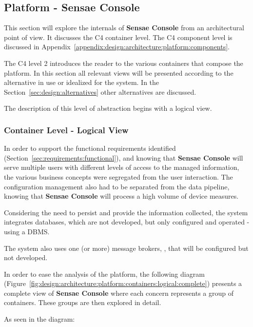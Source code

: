 \subsection{Platform - Sensae Console}
\label{subsec:design:architecture:platform}

This section will explore the internals of \textbf{Sensae Console} from an architectural point of view. It discusses the C4 container level.
The C4 component level is discussed in Appendix~\ref{appendix:design:architecture:platform:components}.

The C4 level 2 introduces the reader to the various containers that compose the platform. In this section all relevant views will be presented according to the alternative in use or idealized for the system. In the Section~\ref{sec:design:alternatives} other alternatives are discussed.

The description of this level of abstraction begins with a logical view.

\subsubsection{Container Level - Logical View}
\label{par:design:architecture:platform:container:logical}

In order to support the functional requirements identified (Section~\ref{sec:requirements:functional}), and knowing that \textbf{Sensae Console} will serve multiple users with different levels of access to the managed information, the various business concepts were segregated from the user interaction. The configuration management also had to be separated from the data pipeline, knowing that \textbf{Sensae Console} will process a high volume of device measures.

Considering the need to persist and provide the information collected, the system integrates databases, which are not developed, but only configured and operated - using a \gls{DBMS}.

The system also uses one (or more) message brokers, \cite{broker}, that will be configured but not developed.

In order to ease the analysis of the platform, the following diagram (Figure~\ref{fig:design:architecture:platform:containers:logical:complete}) presents a complete view of \textbf{Sensae Console} where each concern represents a group of containers. These groups are then explored in detail.

As seen in the diagram:

